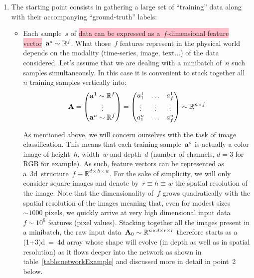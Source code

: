 \documentclass{article}
\begin{document}
\begin{enumerate}
\item The starting point consists in gathering a large set of ``training'' data along with their accompanying ``ground-truth'' labels: 
\begin{itemize}
\item Each sample~$s$ of \colorbox{pink}{data can be expressed as a~$f$-dimensional feature vector}~${\bf a}^s \sim \mathbb{R}^f$. What those~$f$ features represent in the physical world depends on the modality (time-series, image, text...) of the data considered. Let's assume that we are dealing with a minibatch of~$n$ such samples simultaneously.  In this case it is convenient to stack together all~$n$ training samples vertically into:
\begin{equation*}
{\bf A} = \left(
\begin{matrix}
    {\bf a}^1 \sim \mathbb{R}^f  \\
    \vdots \\
    {\bf a}^n \sim \mathbb{R}^f
\end{matrix}
\right) = \left(
\begin{matrix}
    a^{1}_1 & \dots & a^1_f \\
    \vdots & \vdots & \vdots \\
    a^n_1 & \dots & a^n_f
\end{matrix}
\right) \sim \mathbb{R}^{n \times f} 
\label{stackedMatrix}
\end{equation*}

As mentioned above, we will concern ourselves with the task of image classification.  This means that each training sample~${\bf a}^s$ is actually a color image of height~$h$, width~$w$ and depth~$d$ (number of channels, $d=3$ for RGB for example).  As such, feature vectors can be represented as a~3d~structure~$f \equiv \mathbb{R}^{d \times h \times w}$.  For the sake of simplicity, we will only consider square images and denote by~$r \equiv h \equiv w$ the spatial resolution of the image.  Note that the dimensionality of~$f$ grows quadratically with the spatial resolution of the images meaning that, even for modest sizes~$\sim \num[group-separator={,}]{1000}$ pixels, we quickly arrive at very high dimensional input data~$f \sim 10^6$ features (pixel values).  Stacking together all the images present in a minibatch, the raw input data~${\bf A}_0 \sim \mathbb{R}^{n\times d\times r\times r}$ therefore starts as a (1+3)d~=~4d array whose shape will evolve (in depth as well as in spatial resolution) as it flows deeper into the network as shown in table~\ref{table:networkExample} and discussed more in detail in point~2 below.  


\end{itemize}
\end{enumerate}
\end{document}
